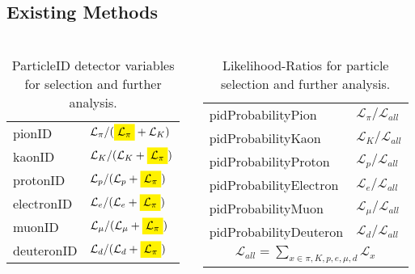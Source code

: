 \documentclass{beamer}
\newcommand{\mathcolorbox}[2]{\colorbox{#1}{$\displaystyle #2$}}
\begin{document}
\subsection{Existing Methods}
\begin{frame}
	\frametitle{\insertsection}
	\framesubtitle{\insertsubsection}

	\begin{columns}
		\begin{column}{0.47\textwidth}
			\begin{table}
				\begin{tabular}{l|l}
					pionID & $\mathcal{L}_{\pi} / (\mathcolorbox{yellow}{\mathcal{L}_{\pi}} + \mathcal{L}_{K})$ \\
					kaonID & $\mathcal{L}_{K} / (\mathcal{L}_{K} +\mathcolorbox{yellow}{\mathcal{L}_{\pi}})$ \\
					protonID & $\mathcal{L}_{p} / (\mathcal{L}_{p} +\mathcolorbox{yellow}{\mathcal{L}_{\pi}})$ \\
					electronID & $\mathcal{L}_{e} / (\mathcal{L}_{e} +\mathcolorbox{yellow}{\mathcal{L}_{\pi}})$ \\
					muonID & $\mathcal{L}_{\mu} / (\mathcal{L}_{\mu} +\mathcolorbox{yellow}{\mathcal{L}_{\pi}})$ \\
					deuteronID & $\mathcal{L}_{d} / (\mathcal{L}_{d} +\mathcolorbox{yellow}{\mathcal{L}_{\pi}})$
				\end{tabular}
				\caption{ParticleID detector variables for selection and further analysis.}
			\end{table}
		\end{column}
		\begin{column}{0.5\textwidth}
			\begin{table}
				\begin{tabular}{l|l}
					pidProbabilityPion & $\mathcal{L}_{\pi} / \mathcal{L}_{all}$ \\
					pidProbabilityKaon & $\mathcal{L}_{K} / \mathcal{L}_{all}$ \\
					pidProbabilityProton & $\mathcal{L}_{p} / \mathcal{L}_{all}$ \\
					pidProbabilityElectron & $\mathcal{L}_{e} / \mathcal{L}_{all}$ \\
					pidProbabilityMuon & $\mathcal{L}_{\mu} / \mathcal{L}_{all}$ \\
					pidProbabilityDeuteron & $\mathcal{L}_{d} / \mathcal{L}_{all}$ \\
					\hline
					\multicolumn{2}{c}{$\mathcal{L}_{all} = \sum \limits_{x \in {\pi, K, p, e, \mu, d}} \mathcal{L}_{x}$}
				\end{tabular}
				\caption{Likelihood-Ratios for particle selection and further analysis.}
			\end{table}
		\end{column}
	\end{columns}
\end{frame}
\end{document}
